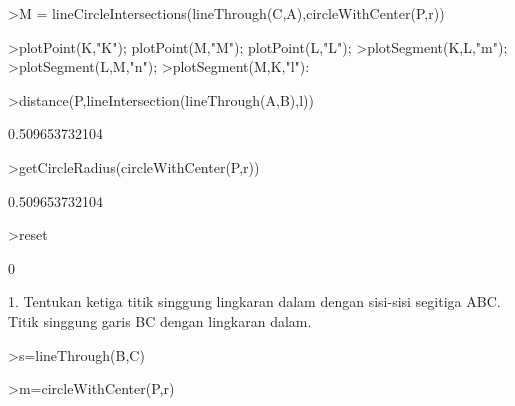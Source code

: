 \documentclass[12pt,arial,letterpaper]{book}
\begin{document}
\begin{eulernootebook}
\begin{eulercomment}
\begin{eulercomment}
\begin{eulernootebook}
\begin{eulercomment}
\begin{eulercomment}
\begin{eulercomment}
\begin{eulercomment}
\begin{eulercomment}
\begin{eulercomment}
\begin{eulernotebook}
\begin{eulercomment}
\begin{eulercomment}
\begin{eulerprompt}
\end{eulerprompt}
\begin{euleroutput}
  [0.632456,  1.31623]
\end{euleroutput}
\begin{eulerprompt}
>M = lineCircleIntersections(lineThrough(C,A),circleWithCenter(P,r))
\end{eulerprompt}
\begin{euleroutput}
  [1.31623,  0.632456]
\end{euleroutput}
\begin{eulerprompt}
>plotPoint(K,"K"); plotPoint(M,"M"); plotPoint(L,"L");
>plotSegment(K,L,"m");
>plotSegment(L,M,"n");
>plotSegment(M,K,"l"):
\end{eulerprompt}
\begin{eulerprompt}
>distance(P,lineIntersection(lineThrough(A,B),l))
\end{eulerprompt}
\begin{euleroutput}
  0.509653732104
\end{euleroutput}
\begin{eulerprompt}
>getCircleRadius(circleWithCenter(P,r))
\end{eulerprompt}
\begin{euleroutput}
  0.509653732104
\end{euleroutput}
\begin{eulerprompt}
>reset
\end{eulerprompt}
\begin{euleroutput}
  0
\end{euleroutput}
\begin{eulercomment}
1. Tentukan ketiga titik singgung lingkaran dalam dengan sisi-sisi
segitiga ABC.\\
Titik singgung garis BC dengan lingkaran dalam.
\end{eulercomment}
\begin{eulerprompt}
>s=lineThrough(B,C)
\end{eulerprompt}
\begin{euleroutput}
  [-1,  2,  2]
\end{euleroutput}
\begin{eulerprompt}
>m=circleWithCenter(P,r)
\end{eulerprompt}
\begin{euleroutput}
  [0.86038,  0.86038,  0.509654]
\end{euleroutput}
\begin{eulerprompt}

\end{eulerprompt}
\end{eulercomment}
\end{eulercomment}
\end{eulernotebook}
\end{eulercomment}
\end{eulercomment}
\end{eulercomment}
\end{eulercomment}
\end{eulercomment}
\end{eulercomment}
\end{eulernootebook}
\end{eulercomment}
\end{eulercomment}
\end{eulernootebook}
\end{document}
